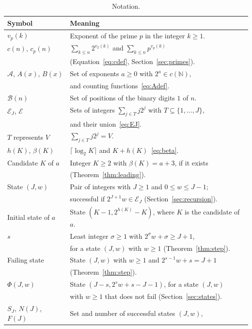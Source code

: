 \documentclass[11pt]{amsart}
\theoremstyle{definition}
\begin{document}
\begin{table}[H]
\centering
\caption{Notation.}
\label{tab:notation}
\small
\setlength{\tabcolsep}{4pt}
\renewcommand{\arraystretch}{1.15}
\begin{tabular}{ll}
\toprule
\textbf{Symbol} & \textbf{Meaning}\\
\midrule
$v_p(k)$ & Exponent of the prime $p$ in the integer $k\ge1$.\\
$c(n)$, $c_p(n)$ & $\sum_{k\le n}2^{v_2(k)}$ and $\sum_{k\le n}p^{v_p(k)}$\\
& (Equation~\eqref{eq:cdef}, Section~\ref{sec:primes}).\\
$\mathcal{A}$, $A(x)$, $B(x)$ & Set of exponents $a\ge0$ with $2^a\in c(\mathbb{N})$,\\
& and counting functions~\eqref{eq:Adef}.\\
$\mathcal{B}(n)$ & Set of positions of the binary digits $1$ of $n$.\\
$\mathcal{E}_J$, $\mathcal{E}$ & Sets of integers $\sum_{j\in T}j2^j$ with $T\subseteq\{1,\dots,J\}$,\\
& and their union~\eqref{eq:EJ}.\\
$T$ represents $V$ & $\sum_{j\in T}j2^j=V$.\\
$h(K)$, $\beta(K)$ & $\lceil\log_2K\rceil$ and $K+h(K)$~\eqref{eq:beta}.\\
Candidate $K$ of $a$ & Integer $K\ge2$ with $\beta(K)=a+3$, if it exists\\
& (Theorem~\ref{thm:leading}).\\
State $(J,w)$ & Pair of integers with $J\ge1$ and $0\le w\le J-1$;\\
& successful if $2^{J+1}w\in\mathcal{E}_J$ (Section~\ref{sec:recursion}).\\
Initial state of $a$ & State $(K-1,2^{h(K)}-K)$, where $K$ is the candidate of $a$.\\
$s$ & Least integer $\sigma\ge1$ with $2^\sigma w+\sigma\ge J+1$,\\
& for a state $(J,w)$ with $w\ge1$ (Theorem~\ref{thm:step}).\\
Failing state & State $(J,w)$ with $w\ge1$ and $2^{s-1}w+s=J+1$\\
& (Theorem~\ref{thm:step}).\\
$\Phi(J,w)$ & State $(J-s,2^sw+s-J-1)$, for a state $(J,w)$\\
& with $w\ge1$ that does not fail (Section~\ref{sec:states}).\\
$S_J$, $N(J)$, $F(J)$ & Set and number of successful states $(J,w)$,\\

\end{tabular}
\end{table}
\end{document}
